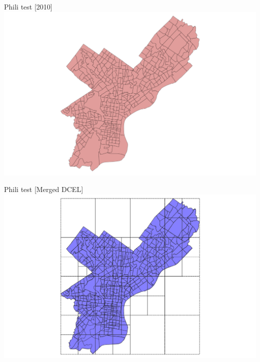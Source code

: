 \documentclass{beamer}
\begin{document}
\begin{frame}{Phili test [2010]}
    \centering 
    \includegraphics[trim=6cm 0cm 6cm 0cm, clip, width=0.6\linewidth]{figures/phili2010} 
\end{frame}

\begin{frame}{Phili test [Merged DCEL]}
    \centering 
    \includegraphics[trim=6cm 0cm 6cm 0cm, clip, width=0.6\linewidth]{figures/faces} 
\end{frame}
\end{document}
